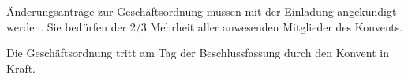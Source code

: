 \documentclass[a4paper, parskip=half, numbers=noenddot]{scrartcl}
\begin{document}
\begin{contract}
Änderungsanträge zur Geschäftsordnung müssen mit der Einladung angekündigt werden. Sie bedürfen der 2/3 Mehrheit aller anwesenden Mitglieder des Konvents.

Die Geschäftsordnung tritt am Tag der Beschlussfassung durch den Konvent in Kraft.


\end{contract}
\end{document}
